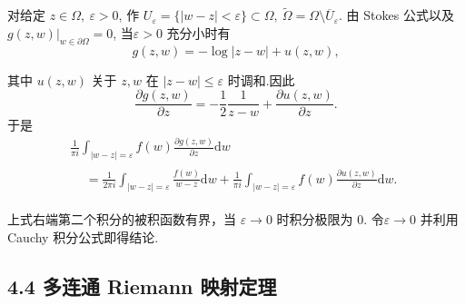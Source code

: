 \begin{itemize}
    对给定 $z\in\Omega,\ \varepsilon>0$,
    作 $U_\varepsilon=\{|w-z|<\varepsilon\}\subset\Omega,
    \ \tilde{\Omega}=\Omega\setminus\overline{U}_\varepsilon$.
    由 Stokes 公式以及 $g(z,w)|_{w\in\partial\Omega}=0$,
    当$\varepsilon>0$ 充分小时有
    $$g(z,w)=-\log|z-w|+u(z,w),$$
    
    其中 $u(z,w)$ 关于 $z,w$ 在 $|z-w|\leq\varepsilon$ 时调和.因此
    $$
    \frac{\partial g(z,w)}{\partial z}
    =-\frac{1}{2}\frac{1}{z-w}+\frac{\partial u(z,w)}{\partial z}.
    $$
    于是
    $$
    \begin{gathered}
    \frac{1}{\pi i} \int _ { | w - z | = \varepsilon }
    f(w)\frac{\partial g(z,w)}{\partial z} \mathrm{d}w \\
    \begin{aligned}&=\frac{1}{2\pi i}\int_{|w-z|=\varepsilon}
        \frac{f(w)}{w-z} \mathrm{d}w+\frac{1}{\pi i}\int_{|w-z|=\varepsilon}
        f(w)\frac{\partial u(z,w)}{\partial z} \mathrm{d}w.\end{aligned} 
    \end{gathered}
    $$
    
    上式右端第二个积分的被积函数有界，当 $\varepsilon\to0$ 时积分极限为 $0$. 
    令$\varepsilon\to0$ 并利用 Cauchy 积分公式即得结论.
\end{itemize} 

 \subsection*{4.4 多连通 Riemann 映射定理}

